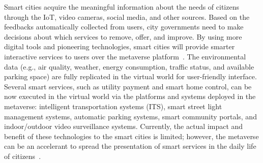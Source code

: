 \documentclass[journal]{IEEEtran}
\begin{document}
Smart cities acquire the meaningful information about the needs of citizens through the IoT, video cameras, social media, and other sources. Based on the feedbacks automatically collected from users, city governments need to make decisions about which services to remove, offer, and improve. By using more digital tools and pioneering technologies, smart cities will provide smarter interactive services to users over the metaverse platform~\cite{kohli2021review}. The environmental data (e.g., air quality, weather, energy consumption, traffic status, and available parking space) are fully replicated in the virtual world for user-friendly interface. Several smart services, such as utility payment and smart home control, can be now executed in the virtual world via the platforms and systems deployed in the metaverse: intelligent transportation systems (ITS), smart street light management systems, automatic parking systems, smart community portals, and indoor/outdoor video surveillance systems. Currently, the actual impact and benefit of these technologies to the smart cities is limited; however, the metaverse can be an accelerant to spread the presentation of smart services in the daily life of citizens~\cite{mohammadi2018enabling}.
\end{document}
